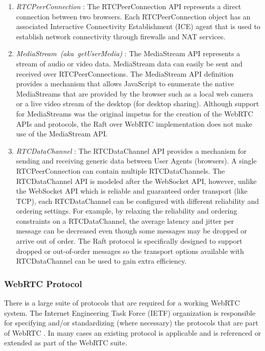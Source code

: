 \documentclass[conference,compsoc]{./IEEEtran/IEEEtran}
\begin{document}
\begin{enumerate}
\item \emph{RTCPeerConnection} \cite{webrtc:rtcpeerconnection:feb2015}:
    The RTCPeerConnection API represents a direct connection between
    two browsers. Each RTCPeerConnection object has an associated
    Interactive Connectivity Establishment (ICE) agent that is used to
    establish network connectivity through firewalls and NAT services.

\item \emph{MediaStream~(aka~getUserMedia)} \cite{webrtc:media-stream:feb2015}:
    The MediaStream API represents a stream of audio or video data.
    MediaStream data can easily be sent and received over
    RTCPeerConnections. The MediaStream API definition provides
    a mechanism that allows JavaScript to enumerate the native
    MediaStreams that are provided by the browser such as a local web
    camera or a live video stream of the desktop (for desktop
    sharing).  Although support for MediaStreams was the original
    impetus for the creation of the WebRTC APIs and protocols, the
    Raft over WebRTC implementation does not make use of the
    MediaStream API.

\item
    \emph{RTCDataChannel} \cite{webrtc:datachannel:feb2015}:
    The RTCDataChannel API provides a mechanism for sending and
    receiving generic data between User Agents (browsers). A single
    RTCPeerConnection can contain multiple RTCDataChannels. The
    RTCDataChannel API is modeled after the WebSocket API, however,
    unlike the WebSocket API which is reliable and guaranteed order
    transport (like TCP), each RTCDataChannel can be configured with
    different reliability and ordering settings. For example, by
    relaxing the reliability and ordering constraints on
    a RTCDataChannel, the average latency and jitter per message can
    be decreased even though some messages may be dropped or arrive
    out of order. The Raft protocol is specifically designed to
    support dropped or out-of-order messages so the transport options
    available with RTCDataChannel can be used to gain extra
    efficiency.
\end{enumerate}


\subsubsection{WebRTC Protocol}

There is a large suite of protocols that are required for a working
WebRTC system. The Internet Engineering Task Force (IETF) organization
is responsible for specifying and/or standardizing (where necessary)
the protocols that are part of WebRTC \cite{draft-rtcweb-overview}
\cite{draft-rtcweb-security-arch} \cite{draft-rtcweb-security}. In many
cases an existing protocol is applicable and is referenced or
extended as part of the WebRTC suite. %
\end{document}

